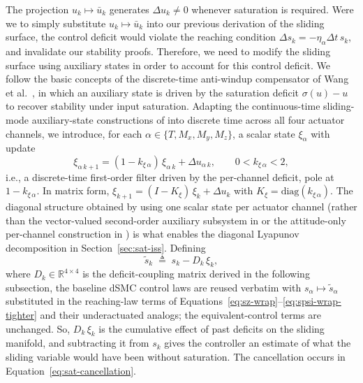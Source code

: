 \documentclass[conf]{new-aiaa}
\begin{document}
The projection $u_k \mapsto \bar u_k$ generates $\Delta u_k \neq 0$ whenever saturation is required. Were we to simply substitute $u_k \mapsto \bar u_k$ into our previous derivation of the sliding surface, the control deficit would violate the reaching condition $\Delta s_k = -\eta_\alpha \Delta t\, s_k$, and invalidate our stability proofs. Therefore, we need to modify the sliding surface using auxiliary states in order to account for this control deficit. We follow the basic concepts of the discrete-time anti-windup compensator of Wang et al.\ \cite{refs:Wang2005}, in which an auxiliary state is driven by the saturation deficit $\sigma(u) - u$ to recover stability under input saturation. Adapting the continuous-time sliding-mode auxiliary-state constructions of \cite{refs:Xu2020, refs:Kuang2024} into discrete time across all four actuator channels, we introduce, for each $\alpha \in \{T, M_x, M_y, M_z\}$, a scalar state $\xi_\alpha$ with update
\small
\begin{equation}
\label{eq:sat-xi-update}
\xi_{\alpha\, k+1} = (1 - k_{\xi\, \alpha})\, \xi_{\alpha\, k} + \Delta u_{\alpha\, k},
\qquad 0 < k_{\xi\, \alpha} < 2,
\end{equation}
\normalsize
i.e., a discrete-time first-order filter driven by the per-channel deficit, pole at $1 - k_{\xi\,\alpha}$. In matrix form, $\xi_{k+1} = (I - K_\xi)\, \xi_k + \Delta u_k$ with $K_\xi = \mathrm{diag}(k_{\xi\, \alpha})$. The diagonal structure obtained by using one scalar state per actuator channel (rather than the vector-valued second-order auxiliary subsystem in \cite{refs:Kuang2024} or the attitude-only per-channel construction in \cite{refs:Xu2020}) is what enables the diagonal Lyapunov decomposition in Section~\ref{sec:sat-iss}. Defining
\begin{equation}
\label{eq:sat-tilde-s}
\tilde s_k \;\triangleq\; s_k - D_k\, \xi_k,
\end{equation}
where $D_k \in \mathbb{R}^{4 \times 4}$ is the deficit-coupling matrix derived in the following subsection, the baseline dSMC control laws are reused verbatim with $s_\alpha \mapsto \tilde s_\alpha$ substituted in the reaching-law terms of Equations~\ref{eq:sz-wrap}–\ref{eq:spsi-wrap-tighter} and their underactuated analogs; the equivalent-control terms are unchanged. So, $D_k\,\xi_k$ is the cumulative effect of past deficits on the sliding manifold, and subtracting it from $s_k$ gives the controller an estimate of what the sliding variable would have been without saturation. The cancellation occurs in Equation~\ref{eq:sat-cancellation}.
\end{document}
